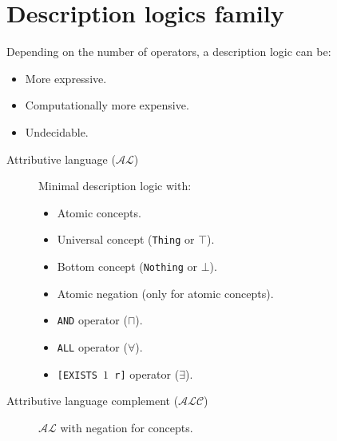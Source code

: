 \section{Description logics family}

Depending on the number of operators, a description logic can be:
\begin{itemize}
    \item More expressive.
    \item Computationally more expensive.
    \item Undecidable.
\end{itemize}

\begin{description}
    \item[Attributive language ($\mathcal{AL}$)] 
        Minimal description logic with:
        \begin{itemize}
            \item Atomic concepts.
            \item Universal concept (\texttt{Thing} or $\top$).
            \item Bottom concept (\texttt{Nothing} or $\bot$).
            \item Atomic negation (only for atomic concepts).
            \item \texttt{AND} operator ($\sqcap$).
            \item \texttt{ALL} operator ($\forall$).
            \item \texttt{[EXISTS $1$ r]} operator ($\exists$).
        \end{itemize}

    \item[Attributive language complement ($\mathcal{ALC}$)] 
        $\mathcal{AL}$ with negation for concepts.
\end{description}

